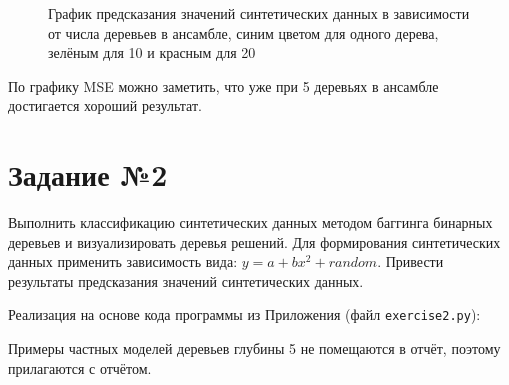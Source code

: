 \documentclass{article} %
\begin{document}
\begin{figure}[H]
    \centering
    \noindent{}
    \caption{График предсказания значений синтетических данных в зависимости от числа деревьев в ансамбле, синим цветом для одного дерева, зелёным для 10 и красным для 20}
\end{figure}
\bigskip

По графику MSE можно заметить, что уже при 5 деревьях в ансамбле достигается хороший результат.

\clearpage
\section{Задание №2}
Выполнить классификацию синтетических данных методом баггинга бинарных
деревьев и визуализировать деревья решений. Для формирования синтетических данных
применить зависимость вида: $y = a+b x^2 + random$. Привести результаты предсказания
значений синтетических данных.
\bigskip

Реализация на основе кода программы из Приложения (файл \verb$exercise2.py$):
\bigskip

Примеры частных моделей деревьев глубины 5 не помещаются в отчёт,
поэтому прилагаются с отчётом.
\end{document}
